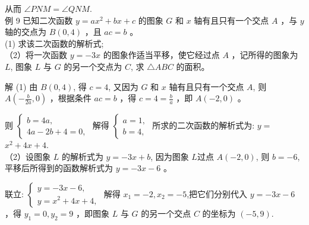 \documentclass[10pt]{article}
\begin{document}
从而 $\angle P N M=\angle Q N M$.\\
例 9 已知二次函数 $y=a x^{2}+b x+c$ 的图象 $G$ 和 $x$ 轴有且只有一个交点 $A$ ，与 $y$ 轴的交点为 $B(0,4)$ ，且 $a c=b$ 。\\
(1) 求该二次函数的解析式;\\
（2）将一次函数 $y=-3 x$ 的图象作适当平移，使它经过点 $A$ ，记所得的图象为 $L$, 图象 $L$ 与 $G$ 的另一个交点为 $C$, 求 $\triangle A B C$ 的面积。

解 (1) 由 $B(0,4)$, 得 $c=4$, 又因为 $G$ 和 $x$ 轴有且只有一个交点 $A$, 则 $A\left(-\frac{b}{2 a}, 0\right)$ ，根据条件 $a c=b$ ，得 $c=4=\frac{b}{a}$ ，即 $A(-2,0)$ 。

则 $\left\{\begin{array}{l}b=4 a, \\ 4 a-2 b+4=0,\end{array}\right.$ 解得 $\left\{\begin{array}{l}a=1, \\ b=4,\end{array}\right.$ 所求的二次函数的解析式为: $y=$ $x^{2}+4 x+4$.\\
（2）设图象 $L$ 的解析式为 $y=-3 x+b$, 因为图象 $L$过点 $A(-2,0)$, 则 $b=-6$, 平移后所得到的函数解析式为 $y=-3 x-6$ 。

联立: $\left\{\begin{array}{l}y=-3 x-6, \\ y=x^{2}+4 x+4,\end{array}\right.$ 解得 $x_{1}=-2, x_{2}=-5$,把它们分别代入 $y=-3 x-6$ ，得 $y_{1}=0, y_{2}=9$ ，即图象 $L$ 与 $G$ 的另一个交点 $C$ 的坐标为 $(-5,9)$.
\end{document}
